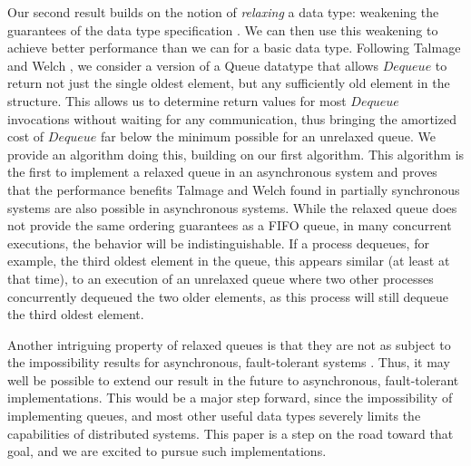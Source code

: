 \documentclass[a4paper,USenglish]{lipics-v2021} %
\begin{document}
Our second result builds on the notion of \emph{relaxing} a data type: weakening the guarantees of the data type specification \cite{HenzingerKirschPayerSezginSokolova13}.  We can then use this weakening to achieve better performance than we can for a basic data type.  Following Talmage and Welch \cite{TalmageWelch14}, we consider a version of a Queue datatype that allows $Dequeue$ to return not just the single oldest element, but any sufficiently old element in the structure.  This allows us to determine return values for most $Dequeue$ invocations without waiting for any communication, thus bringing the amortized cost of $Dequeue$ far below the minimum possible for an unrelaxed queue.  We provide an algorithm doing this, building on our first algorithm.  This algorithm is the first to implement a relaxed queue in an asynchronous system and proves that the performance benefits Talmage and Welch \cite{TalmageWelch14} found in partially synchronous systems are also possible in asynchronous systems.  While the relaxed queue does not provide the same ordering guarantees as a FIFO queue, in many concurrent executions, the behavior will be indistinguishable.  If a process dequeues, for example, the third oldest element in the queue, this appears similar (at least at that time), to an execution of an unrelaxed queue where two other processes concurrently dequeued the two older elements, as this process will still dequeue the third oldest element.

Another intriguing property of relaxed queues is that they are not as subject to the impossibility results for asynchronous, fault-tolerant systems \cite{ShavitTaubenfeld16,TalmageWelch19}.  Thus, it may well be possible to extend our result in the future to asynchronous, fault-tolerant implementations.  This would be a major step forward, since the impossibility of implementing queues, and most other useful data types severely limits the capabilities of distributed systems.  This paper is a step on the road toward that goal, and we are excited to pursue such implementations.

\end{document}
